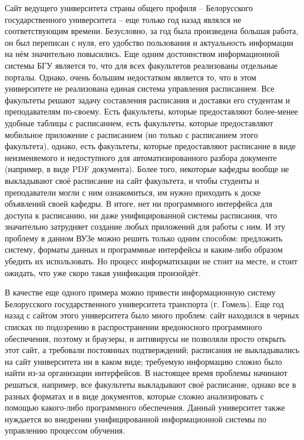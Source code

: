 Сайт ведущего университета страны общего профиля -- Белорусского государственного университета -- еще только год назад являлся не соответствующим времени. Безусловно, за год была произведена большая работа, он был переписан с нуля, его удобство пользования и актуальность информации на нём значительно повысились. Еще одним достоинством информационной системы БГУ является то, что для всех факультетов реализованы отдельные порталы. Однако, очень большим недостатком является то, что в этом университете не реализована единая система управления расписанием. Все факультеты решают задачу составления расписания и доставки его студентам и преподавателям по-своему. Есть факультеты, которые предоставляют более-менее удобные таблицы с расписанием, есть факультеты, которые предоставляют мобильное приложение с расписанием (но только с расписанием этого факультета), однако, есть факультеты, которые предоставляют расписание в виде неизменяемого и недоступного для автоматизированного разбора документе (например, в виде PDF документа). Более того, некоторые кафедры вообще не выкладывают своё расписание на сайт факультета, и чтобы студенты и преподаватели могли с ним ознакомиться, им нужно приходить к доске объявлений своей кафедры. В итоге, нет ни программного интерфейса для доступа к расписанию, ни даже унифицированной системы расписания, что значительно затрудняет создание любых приложений для работы с ним. И эту проблему в данном ВУЗе можно решить только одним способом: предложить систему, форматы данных и программные интерфейсы и каким-либо образом убедить их использовать. Но процесс информатизации не стоит на месте, и стоит ожидать, что уже скоро такая унификация произойдёт.

В качестве еще одного примера можно привести информационную систему Белорусского государственного университета транспорта (г. Гомель). Еще год назад с сайтом этого университета было много проблем: сайт находился в черных списках по подозрению в распространении вредоносного программного обеспечения, поэтому и браузеры, и антивирусы не позволяли просто открыть этот сайт, а требовали постоянных подтверждений; расписания не выкладывались на сайт университета ни в каком виде; требуемую информацию сложно было найти из-за организации интерфейсов. В настоящее время проблемы начинают решаться, например, все факультеты выкладывают своё расписание, однако все в разных форматах и в виде документов, которые сложно анализировать с помощью какого-либо программного обеспечения. Данный университет также нуждается во внедрении унифицированной информационной системы по управлению процессом обучения. 

